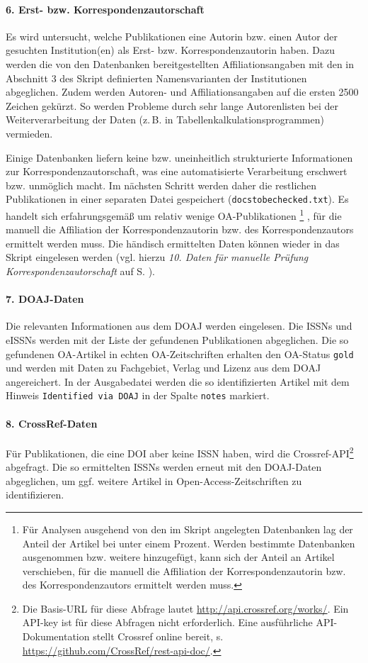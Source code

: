 \paragraph{6. Erst- bzw. Korrespondenzautorschaft} \label{func-corr-author}
Es wird untersucht, welche Publikationen eine Autorin bzw. einen Autor der gesuchten Institution(en) als Erst- bzw. Korrespondenzautorin haben. Dazu werden die von den Datenbanken bereitgestellten Affiliationsangaben mit den in Abschnitt 3 des Skript definierten Namensvarianten der Institutionen abgeglichen. Zudem werden Autoren- und Affiliationsangaben auf die ersten 2500 Zeichen gekürzt. So werden Probleme durch sehr lange Autorenlisten bei der Weiterverarbeitung der Daten (z.\,B. in Tabellenkalkulationsprogrammen) vermieden.

Einige Datenbanken liefern keine bzw. uneinheitlich strukturierte Informationen zur Korres\-pondenzautorschaft, was eine automatisierte Verarbeitung erschwert bzw. unmöglich macht. Im nächsten Schritt werden daher die restlichen Publikationen in einer separaten Datei gespeichert (\texttt{docstobechecked.txt}). Es handelt sich erfahrungsgemäß um relativ wenige OA-Publikationen \footnote{{Für Analysen ausgehend von den im Skript angelegten Datenbanken lag der Anteil der Artikel bei unter einem Prozent. Werden bestimmte Datenbanken ausgenommen bzw. weitere hinzugefügt, kann sich der Anteil an Artikel verschieben, für die manuell die Affiliation der Korrespondenzautorin bzw. des Korrespondenzautors ermittelt werden muss.}}
, für die manuell die Affiliation der Korrespondenzautorin bzw. des Korrespondenzautors ermittelt werden muss. Die händisch ermittelten Daten können wieder in das Skript eingelesen werden (vgl. hierzu \textit{10. Daten für manuelle Prüfung Korrespondenzautorschaft} auf S. \pageref{man-corr-author}).

\paragraph{7. DOAJ-Daten}
Die relevanten Informationen aus dem DOAJ werden eingelesen. Die ISSNs und eISSNs werden mit der Liste der gefundenen Publikationen abgeglichen. Die so gefundenen OA-Artikel in echten OA-Zeitschriften erhalten den OA-Status \texttt{gold} und werden mit Daten zu Fachgebiet, Verlag und Lizenz aus dem DOAJ angereichert.
In der Ausgabedatei werden die so identifizierten Artikel mit dem Hinweis \texttt{Identified via DOAJ} in der Spalte \texttt{notes} markiert.

\paragraph{8. CrossRef-Daten}
Für Publikationen, die eine DOI aber keine ISSN haben, wird die Crossref-API\footnote{Die Basis-URL für diese Abfrage lautet \url{http://api.crossref.org/works/}. Ein API-key ist für diese Abfragen nicht erforderlich. Eine ausführliche API-Dokumentation stellt Crossref online bereit, s. \url{https://github.com/CrossRef/rest-api-doc/}.} abgefragt. Die so ermittelten ISSNs werden erneut mit den DOAJ-Daten abgeglichen, um ggf. weitere Artikel in Open-Access-Zeitschriften zu identifizieren.

